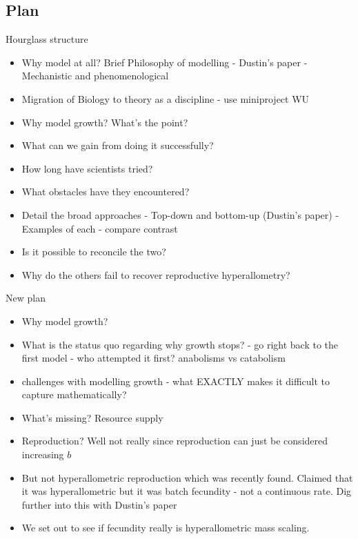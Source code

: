 \documentclass[a4paper]{article} %
\begin{document}
    \subsection{Plan}
        Hourglass structure
        \begin{itemize}
            \item Why model at all? Brief Philosophy of modelling - Dustin's paper - Mechanistic and phenomenological
            \item Migration of Biology to theory as a discipline - use miniproject WU
            \item Why model growth? What's the point? 
            \item What can we gain from doing it successfully? 
            \item How long have scientists tried?
            \item What obstacles have they encountered?
            \item Detail the broad approaches - Top-down and bottom-up (Dustin's paper) - Examples of each - compare contrast
            \item Is it possible to reconcile the two?
            \item Why do the others fail to recover reproductive hyperallometry?
        \end{itemize}
        New plan
        \begin{itemize}
            \item Why model growth?
            \item What is the status quo regarding why growth stops? - go right back to the first model - who attempted it first? anabolisms vs catabolism
            \item challenges with modelling growth - what EXACTLY makes it difficult to capture mathematically?
            \item What's missing? Resource supply
            \item Reproduction? Well not really since reproduction can just be considered increasing $b$
            \item But not hyperallometric reproduction which was recently found. Claimed that it was hyperallometric but it was batch fecundity - not a continuous rate. Dig further into this with Dustin's paper
            \item We set out to see if fecundity really is hyperallometric mass scaling.
        \end{itemize}
    
\end{document}
